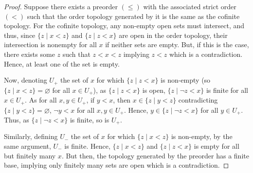 \documentclass{article}
\begin{document}
\begin{proof}
Suppose there exists a preorder \((\le)\) with the associated strict order \((<)\) such that the order topology generated by it is the same as the cofinite
topology. For the cofinite topology, any non-empty open sets must intersect, and thus, since \(\{z \mid x < z\}\) and
\(\{z \mid z < x\}\) are open in the order topology, their intersection is nonempty for all \(x\) if neither sets are empty.
But, if this is the case, there exists some \(z\) such that \(z < x < z\) implying \(z < z\) which is a contradiction.
Hence, at least one of the set is empty.

Now, denoting \(U_+\) the set of \(x\) for which \(\{z \mid z < x\}\) is non-empty (so \(\{z \mid x < z\} = \varnothing\) for all \(x \in U_+\)), as
\(\{z \mid z < x\}\) is open, \(\{z \mid \neg z < x\}\) is finite for all \(x \in U_+\). As for all \(x, y \in U_+\), if \(y < x\),
then \(x \in \{z \mid y < z\}\) contradicting \(\{z \mid y < z\} = \varnothing\), \(\neg y < x\) for all \(x, y \in U_+\). Hence,
\(y \in \{z \mid \neg z < x\}\) for all \(y \in U_+\). Thus, as \(\{z \mid \neg z < x\}\) is finite, so is \(U_+\).

Similarly, defining \(U_-\) the set of \(x\) for which \(\{z \mid x < z\}\) is non-empty, by the same argument, \(U_-\) is finite.
Hence, \(\{z \mid x < z\}\) and \(\{z \mid z < x\}\) is empty for all but finitely many \(x\). But then, the topology generated by
the preorder has a finite base, implying only finitely many sets are open which is a contradiction.

\end{proof}
\end{document}
